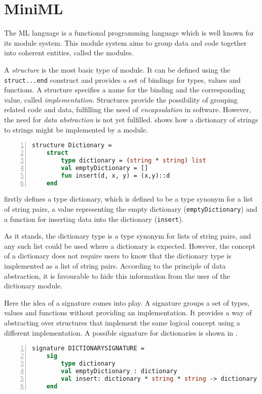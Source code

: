 \documentclass[10pt,a4paper,master=cws, masteroption=ai,english,inputenc=utf8]{kulemt}
\begin{document}
\section{MiniML\label{sec:MiniML}}
The ML language is a functional programming language which is well known for its module system.
This module system aims to group data and code together into coherent entities, called the modules.

A \emph{structure} is the most basic type of module.
It can be defined using the \texttt{struct...end} construct and provides a set of bindings for types, values and functions.
A structure specifies a name for the binding and the corresponding value, called \emph{implementation}.
Structures provide the possibility of grouping related code and data, fulfilling the need of \emph{encapsulation} in software.
However, the need for \emph{data abstraction} is not yet fulfilled.
 shows how a dictionary of strings to strings might be implemented by a module.
~
\begin{lstlisting}[frame=single, language=ML,caption=An example structure showing the definition of a dictionary in ML, label=code:DictionaryStructureExample,numbers=left]
structure Dictionary =
    struct
        type dictionary = (string * string) list
        val emptyDictionary = []
        fun insert(d, x, y) = (x,y)::d
    end
\end{lstlisting}

 firstly defines a type dictionary, which is defined to be a type synonym for a list of string pairs, a value representing the empty dictionary (\texttt{emptyDictionary}) and a function for inserting data into the dictionary (\texttt{insert}).

As it stands, the dictionary type is a type synonym for lists of string pairs, and any such list could be used where a dictionary is expected.
However, the concept of a dictionary does not require users to know that the dictionary type is implemented as a list of string pairs.
According to the principle of data abstraction, it is favourable to hide this information from the user of the dictionary module.

Here the idea of a signature comes into play.
A signature groups a set of types, values and functions without providing an implementation.
It provides a way of abstracting over structures that implement the same logical concept using a different implementation.
A possible signature for dictionaries is shown in .
~
\begin{lstlisting}[frame=single, language=ML, caption=An example signature showing the declaration of a dictionary in ML, label=code:SignatureDictionaryExample, numbers=left]
signature DICTIONARYSIGNATURE =
    sig
        type dictionary
        val emptyDictionary : dictionary
        val insert: dictionary * string * string -> dictionary
    end
\end{lstlisting}
\end{document}
